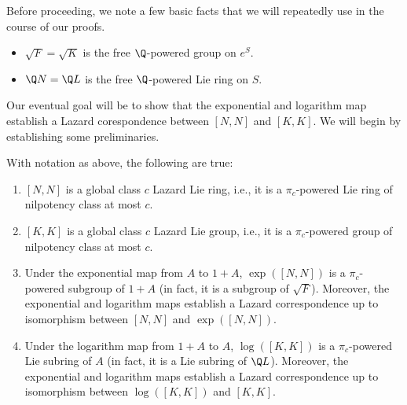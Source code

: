 \documentclass{ucetd}
\begin{document}
Before proceeding, we note a few basic facts that we will repeatedly
use in the course of our proofs.

\begin{itemize}
\item $\sqrt{F} = \sqrt{K}$ is the free $\Q$-powered group on $e^S$.
\item $\Q N = \Q L$ is the free $\Q$-powered Lie ring on $S$.
\end{itemize}

Our eventual goal will be to show that the exponential and logarithm
map establish a Lazard corespondence between $[N,N]$ and $[K,K]$. We
will begin by establishing some preliminaries.

\begin{lemma}\label{lemma:lazard-correspondence-derived-setup}
  With notation as above, the following are true:

  \begin{enumerate}
  \item $[N,N]$ is a global class $c$ Lazard Lie ring, i.e., it is a
    $\pi_c$-powered Lie ring of nilpotency class at most $c$.
  \item $[K,K]$ is a global class $c$ Lazard Lie group, i.e., it is a
    $\pi_c$-powered group of nilpotency class at most $c$.
  \item Under the exponential map from $A$ to $1 + A$, $\exp([N,N])$
    is a $\pi_c$-powered subgroup of $1 + A$ (in fact, it is a
    subgroup of $\sqrt{F}$). Moreover, the exponential and logarithm
    maps establish a Lazard correspondence up to isomorphism between
    $[N,N]$ and $\exp([N,N])$.
  \item Under the logarithm map from $1 + A$ to $A$, $\log([K,K])$ is
    a $\pi_c$-powered Lie subring of $A$ (in fact, it is a Lie subring
    of $\Q L$). Moreover, the exponential and logarithm maps
    establish a Lazard correspondence up to isomorphism between
    $\log([K,K])$ and $[K,K]$.
  \end{enumerate}
\end{lemma}
\end{document}
